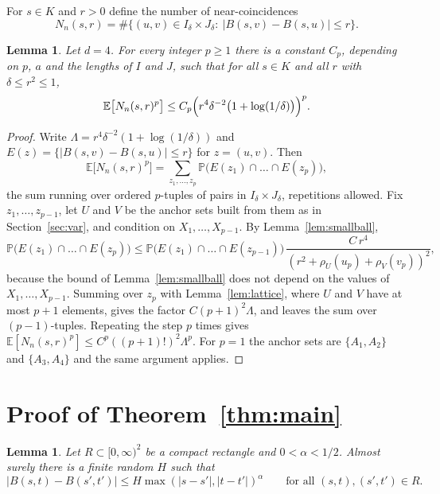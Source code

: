 \documentclass[11pt]{amsart}
\newtheorem{lemma}[theorem]{Lemma}
\theoremstyle{remark}
\newcommand{\PP}{\mathbb{P}}
\newcommand{\E}{\mathbb{E}}
\begin{document}
For $s\in K$ and $r>0$ define the number of near-coincidences
\[
N_n(s,r)=\#\bigl\{(u,v)\in I_\delta\times J_\delta:\ |B(s,v)-B(s,u)|\le r\bigr\}.
\]

\begin{lemma}\label{lem:moments}
Let $d=4$. For every integer $p\ge1$ there is a constant $C_p$, depending on $p$, $a$ and the lengths of $I$ and $J$,
such that for all $s\in K$ and all $r$ with $\delta\le r^2\le1$,
\begin{equation}\label{eq:moments}
\E\bigl[N_n(s,r)^p\bigr]\le C_p\Bigl(r^4\delta^{-2}\bigl(1+\log(1/\delta)\bigr)\Bigr)^p.
\end{equation}
\end{lemma}

\begin{proof}
Write $\Lambda=r^4\delta^{-2}(1+\log(1/\delta))$ and $E(z)=\{|B(s,v)-B(s,u)|\le r\}$ for $z=(u,v)$. Then
\[
\E\bigl[N_n(s,r)^p\bigr]=\sum_{z_1,\dots,z_p}\PP\bigl(E(z_1)\cap\dots\cap E(z_p)\bigr),
\]
the sum running over ordered $p$-tuples of pairs in $I_\delta\times J_\delta$, repetitions allowed. Fix
$z_1,\dots,z_{p-1}$, let $U$ and $V$ be the anchor sets built from them as in Section~\ref{sec:var}, and condition on
$X_1,\dots,X_{p-1}$. By Lemma~\ref{lem:smallball},
\[
\PP\bigl(E(z_1)\cap\dots\cap E(z_p)\bigr)\le\PP\bigl(E(z_1)\cap\dots\cap E(z_{p-1})\bigr)\,
\frac{C\,r^4}{(r^2+\rho_U(u_p)+\rho_V(v_p))^2},
\]
because the bound of Lemma~\ref{lem:smallball} does not depend on the values of $X_1,\dots,X_{p-1}$. Summing over $z_p$
with Lemma~\ref{lem:lattice}, where $U$ and $V$ have at most $p+1$ elements, gives the factor $C(p+1)^2\Lambda$, and
leaves the sum over $(p-1)$-tuples. Repeating the step $p$ times gives $\E[N_n(s,r)^p]\le C^p((p+1)!)^2\Lambda^p$. For
$p=1$ the anchor sets are $\{A_1,A_2\}$ and $\{A_3,A_4\}$ and the same argument applies.
\end{proof}

\section{Proof of Theorem~\ref{thm:main}}\label{sec:proof}

\begin{lemma}\label{lem:holder}
Let $R\subset[0,\infty)^2$ be a compact rectangle and $0<\alpha<1/2$. Almost surely there is a finite random $H$ such
that
\begin{equation}\label{eq:holder}
|B(s,t)-B(s',t')|\le H\max(|s-s'|,|t-t'|)^\alpha\qquad\text{for all }(s,t),(s',t')\in R.
\end{equation}
\end{lemma}
\end{document}
